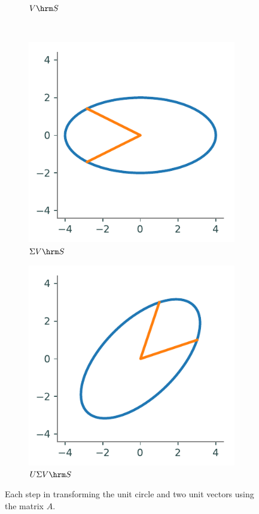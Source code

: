 \begin{figure}
\begin{subfigure}{.35\textwidth}
  \caption{$V\hrm S$}
\end{subfigure}
\\
\begin{subfigure}{.35\textwidth}
  \centering
  \includegraphics[width=\textwidth]{figures/svcircle.pdf}
  \caption{$\Sigma V\hrm S$}
\end{subfigure}
\quad
\begin{subfigure}{.35\textwidth}
  \centering
  \includegraphics[width=\textwidth]{figures/full_transformation.pdf}
  \caption{$U \Sigma V\hrm S$}
\end{subfigure}
\caption{Each step in transforming the unit circle and two unit vectors using the matrix $A$.}
\label{fig:svd-visualization}
\end{figure}

